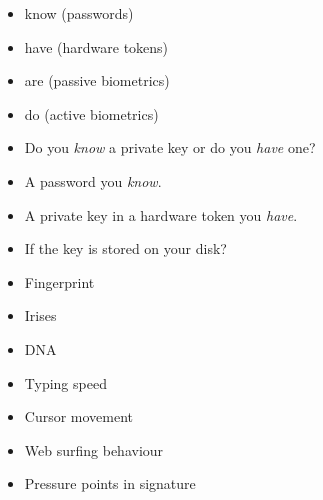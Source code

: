 \begin{frame}
  \begin{example}
    \begin{itemize}
      \item know (passwords)
      \item have (hardware tokens)
      \item are (passive biometrics)
      \item do (active biometrics)
    \end{itemize}
  \end{example}

  \pause{}

  \begin{remark}
    \begin{itemize}
      \item Do you \emph{know} a private key or do you \emph{have} one?
      \item A password you \emph{know}.
      \item A private key in a hardware token you \emph{have}.
      \item If the key is stored on your disk?
    \end{itemize}
  \end{remark}
\end{frame}

\begin{frame}
  \begin{example}
    \begin{itemize}
      \item Fingerprint
      \item Irises
      \item DNA
    \end{itemize}
  \end{example}

  \pause{}

  \begin{example}
    \begin{itemize}
      \item Typing speed
      \item Cursor movement
      \item Web surfing behaviour
      \item Pressure points in signature
    \end{itemize}
  \end{example}
\end{frame}

